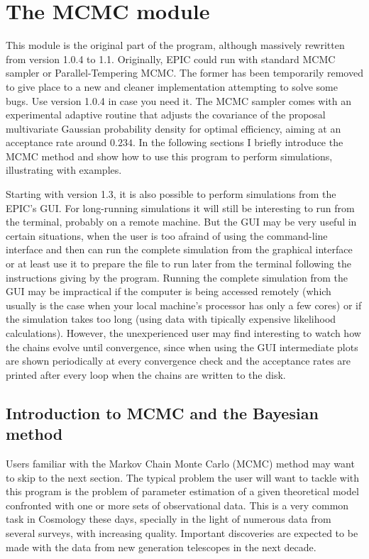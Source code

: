 \documentclass[letterpaper,12pt,english]{sphinxhowto}
\begin{document}
\noindent{}


\section{The MCMC module}
\label{\detokenize{MCMCmodule::doc}}\label{\detokenize{MCMCmodule:the-mcmc-module}}
This module is the original part of the program, although massively rewritten
from version 1.0.4 to 1.1.
Originally, EPIC could run with standard MCMC sampler or Parallel-Tempering MCMC.
The former has been temporarily removed to give place to a new and cleaner
implementation attempting to solve some bugs.
Use version 1.0.4 in case you need it.
The MCMC sampler comes with an experimental adaptive routine that adjusts the
covariance of the proposal multivariate Gaussian probability density for
optimal efficiency, aiming at an acceptance rate around \(0.234\).
In the following sections I briefly introduce the MCMC method and show how to
use this program to perform simulations, illustrating with examples.

Starting with version 1.3, it is also possible to perform simulations from the
EPIC’s GUI.
For long-running simulations it will still be interesting to run from the
terminal, probably on a remote machine.
But the GUI may be very useful in certain situations, when the user is too
afraind of using the command-line interface and then can run the complete
simulation from the graphical interface or at least use it to prepare the
 file to run later from the terminal following the instructions giving
by the program.
Running the complete simulation from the GUI may be impractical if the computer
is being accessed remotely (which usually is the case when your local machine’s
processor has only a few cores) or if the simulation takes too long (using data
with tipically expensive likelihood calculations).
However, the unexperienced user may find interesting to watch how the chains
evolve until convergence, since when using the GUI intermediate plots are shown
periodically at every convergence check and the acceptance rates are printed
after every loop when the chains are written to the disk.


\subsection{Introduction to MCMC and the Bayesian method}
\label{\detokenize{intro::doc}}\label{\detokenize{intro:introduction-to-mcmc-and-the-bayesian-method}}
Users familiar with the Markov Chain Monte Carlo (MCMC) method may want to skip
to the next section.
The typical problem the user will want to tackle with this program is the
problem of parameter estimation of a given theoretical model confronted with
one or more sets of observational data.
This is a very common task in Cosmology these days, specially in the light of
numerous data from several surveys, with increasing quality.
Important discoveries are expected to be made with the data from new generation
telescopes in the next decade.
\end{document}
